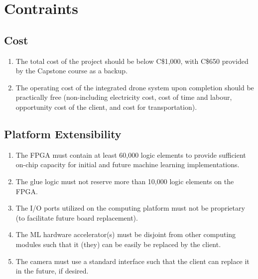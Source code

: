 \documentclass[10pt,letterpaper]{article}
\begin{document}
\section{Contraints}


\subsection{Cost}
\begin{enumerate}[label=C.CT.\arabic*, wide=1cm, widest=3cm, leftmargin=*, font=\bfseries, noitemsep,topsep=0pt, parsep=4pt, partopsep=0pt]
    \item The total cost of the project should be below C\$1,000, with C\$650 provided by the Capstone course as a backup.
    \item The operating cost of the integrated drone system upon completion should be practically free (non-including electricity cost, cost of time and labour, opportunity cost of the client, and cost for transportation).
\end{enumerate}

\subsection{Platform Extensibility}
\begin{enumerate}[label=C.EX.\arabic*, wide=1cm, widest=3cm, leftmargin=*, font=\bfseries, noitemsep,topsep=0pt, parsep=4pt, partopsep=0pt]
    \item The FPGA must contain at least 60,000 logic elements to provide sufficient on-chip capacity for initial and future machine learning implementations.
    \item The glue logic must not reserve more than 10,000 logic elements on the FPGA.
    \item The I/O ports utilized on the computing platform must not be proprietary (to facilitate future board replacement).
    \item The ML hardware accelerator(s) must be disjoint from other computing modules such that it (they) can be easily be replaced by the client.
    \item The camera must use a standard interface such that the client can replace it in the future, if desired.
\end{enumerate}
\end{document}
